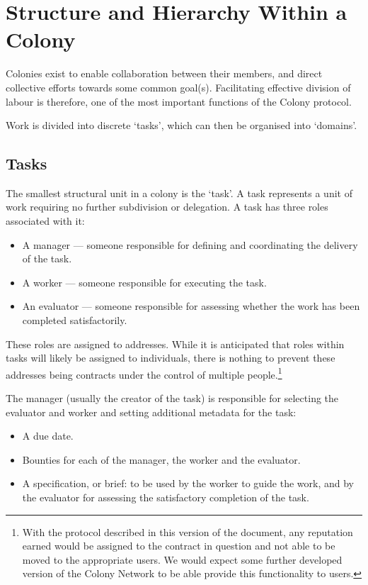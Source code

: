 \section{Structure and Hierarchy Within a Colony}\label{sec:colony-structure}
Colonies exist to enable collaboration between their members, and direct collective efforts towards some common goal(s). Facilitating effective division of labour is therefore, one of the most important functions of the Colony protocol.

Work is divided into discrete `tasks', which can then be organised into `domains'.

\subsection{Tasks}\label{sec:tasks}

The smallest structural unit in a colony is the `task'. A task represents a unit of work requiring no further subdivision or delegation. A task has three roles associated with it:
\begin{itemize}
\item A manager --- someone responsible for defining and coordinating the delivery of the task.
\item A worker --- someone responsible for executing the task.
\item An evaluator --- someone responsible for assessing whether the work has been completed satisfactorily.
\end{itemize}

These roles are assigned to addresses. While it is anticipated that roles within tasks will likely be assigned to individuals, there is nothing to prevent these addresses being contracts under the control of multiple people.\footnote{With the protocol described in this version of the document, any reputation earned would be assigned to the contract in question and not able to be moved to the appropriate users. We would expect some further developed version of the Colony Network to be able provide this functionality to users.}

The manager (usually the creator of the task) is responsible for selecting the evaluator and worker and setting additional metadata for the task:

\begin{itemize}
\item A due date.
\item Bounties for each of the manager, the worker and the evaluator.
\item A specification, or brief: to be used by the worker to guide the work, and by the evaluator for assessing the satisfactory completion of the task.
\end{itemize}

